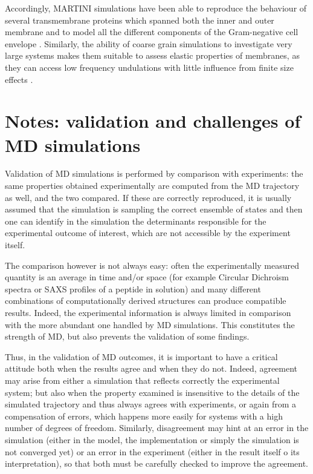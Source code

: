 Accordingly, MARTINI simulations have been able to reproduce the behaviour of several transmembrane proteins which spanned both the inner and outer membrane \cite{Hsu2017} and to model all the different components of the Gram-negative cell envelope \cite{Khalid2019}.
%
Similarly, the ability of coarse grain simulations to investigate very large systems makes them suitable to assess elastic properties of membranes, as they can access low frequency undulations with little influence from finite size effects \cite{Fowler2016}.


\section{Notes: validation and challenges of MD simulations}

Validation of MD simulations is performed by comparison with experiments: the same properties obtained experimentally are computed from the MD trajectory as well, and the two compared. If these are correctly reproduced, it is usually assumed that the simulation is sampling the correct ensemble of states and then one can identify in the simulation the determinants responsible for the experimental outcome of interest, which are not accessible by the experiment itself.

The comparison however is not always easy: often the experimentally measured quantity is an average in time and/or space (for example Circular Dichroism spectra or SAXS profiles of a peptide in solution) and many different combinations of computationally derived structures can produce compatible results. Indeed, the experimental information is always limited in comparison with the more abundant one handled by MD simulations. This constitutes the strength of MD, but also prevents the validation of some findings.

Thus, in the validation of MD outcomes, it is important to have a critical attitude both when the results agree and when they do not.
%
Indeed, agreement may arise from either a simulation that reflects correctly the experimental system; but also when the property examined is insensitive to the details of the simulated trajectory and thus always agrees with experiments, or again from a compensation of errors, which happens more easily for systems with a high number of degrees of freedom.
%
Similarly, disagreement may hint at an error in the simulation (either in the model, the implementation or simply the simulation is not converged yet) or an error in the experiment (either in the result itself o its interpretation), so that both must be carefully checked to improve the agreement.

